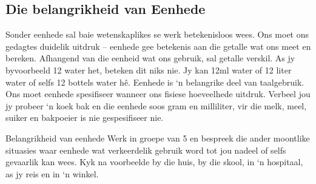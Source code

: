 \subsection*{Die belangrikheid van Eenhede}
            \nopagebreak
Sonder eenhede sal baie wetenskaplikes se werk betekenisloos wees. Ons moet ons gedagtes duidelik uitdruk – eenhede gee betekenis aan die getalle wat ons meet en bereken. Afhangend van die eenheid wat ons gebruik, sal getalle verskil. As jy byvoorbeeld 12 water het, beteken dit niks nie. Jy kan 12ml water of 12 liter water of selfs 12 bottels water hê. Eenhede is ‘n belangrike deel van taalgebruik. Ons moet eenhede spesifiseer wanneer ons fisiese hoeveelhede uitdruk. Verbeel jou jy probeer ‘n koek bak en die eenhede soos gram en milliliter, vir die melk, meel, suiker en bakpoeier is nie gespesifiseer nie.
\begin{groupdiscussion}{Belangrikheid van eenhede}
            \nopagebreak
Werk in groepe van 5 en bespreek die ander moontlike situasies waar eenhede wat verkeerdelik gebruik word tot jou nadeel of selfs gevaarlik kan wees. Kyk na voorbeelde by die huis, by die skool, in ‘n hospitaal, as jy reis en in ‘n winkel.
\end{groupdiscussion}

